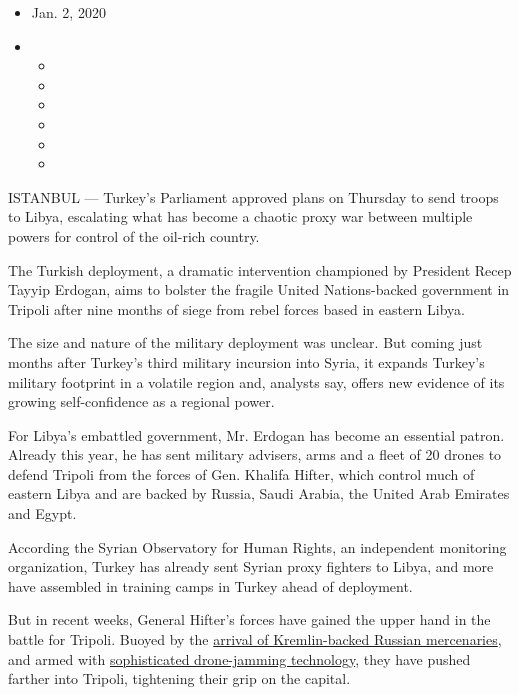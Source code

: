 \begin{itemize}
\item
  Jan. 2, 2020
\item
  \begin{itemize}
  \item
  \item
  \item
  \item
  \item
  \item
  \end{itemize}
\end{itemize}

ISTANBUL --- Turkey's Parliament approved plans on Thursday to send
troops to Libya, escalating what has become a chaotic proxy war between
multiple powers for control of the oil-rich country.

The Turkish deployment, a dramatic intervention championed by President
Recep Tayyip Erdogan, aims to bolster the fragile United Nations-backed
government in Tripoli after nine months of siege from rebel forces based
in eastern Libya.

The size and nature of the military deployment was unclear. But coming
just months after Turkey's third military incursion into Syria, it
expands Turkey's military footprint in a volatile region and, analysts
say, offers new evidence of its growing self-confidence as a regional
power.

For Libya's embattled government, Mr. Erdogan has become an essential
patron. Already this year, he has sent military advisers, arms and a
fleet of 20 drones to defend Tripoli from the forces of Gen. Khalifa
Hifter, which control much of eastern Libya and are backed by Russia,
Saudi Arabia, the United Arab Emirates and Egypt.

According the Syrian Observatory for Human Rights, an independent
monitoring organization, Turkey has already sent Syrian proxy fighters
to Libya, and more have assembled in training camps in Turkey ahead of
deployment.

But in recent weeks, General Hifter's forces have gained the upper hand
in the battle for Tripoli. Buoyed by the
\href{https://www.nytimes.com/2019/11/05/world/middleeast/russia-libya-mercenaries.html}{arrival
of Kremlin-backed Russian mercenaries}, and armed with
\href{https://www.bloomberg.com/news/articles/2019-12-21/libya-security-chief-says-russians-spearheading-tripoli-fighting}{sophisticated
drone-jamming technology}, they have pushed farther into Tripoli,
tightening their grip on the capital.

